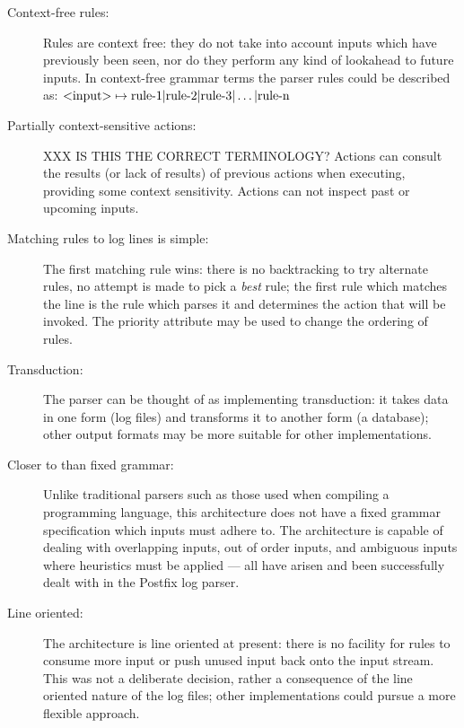 \documentclass[draft]{svmult}
\begin{document}
\begin{description}

    \item [Context-free rules:]  Rules are context free: they do not take
        into account inputs which have previously been seen, nor do they
        perform any kind of lookahead to future inputs.  In context-free
        grammar terms the parser rules could be described as:
        $\text{\textless{}input\textgreater{}} \mapsto \text{rule-1} |
        \text{rule-2} | \text{rule-3} | \dots | \text{rule-n}$

    \item [Partially context-sensitive actions:]  XXX IS THIS THE CORRECT
        TERMINOLOGY\@?  Actions can consult the results (or lack of
        results) of previous actions when executing, providing some context
        sensitivity.  Actions can not inspect past or upcoming inputs.

    \item [Matching rules to log lines is simple:]  The first matching rule
        wins: there is no backtracking to try alternate rules, no attempt
        is made to pick a \textit{best\/} rule; the first rule which
        matches the line is the rule which parses it and determines the
        action that will be invoked.  The priority attribute may be used to
        change the ordering of rules.

    \item [Transduction:]  The parser can be thought of as implementing
        transduction: it takes data in one form (log files) and transforms
        it to another form (a database); other output formats may be more
        suitable for other implementations.

    \item [Closer to \NLP{} than fixed grammar:]  Unlike traditional
        parsers such as those used when compiling a programming language,
        this architecture does not have a fixed grammar specification which
        inputs must adhere to.  The architecture is capable of dealing with
        overlapping inputs, out of order inputs, and ambiguous inputs where
        heuristics must be applied --- all have arisen and been
        successfully dealt with in the Postfix log parser.

    \item [Line oriented:]  The architecture is line oriented at present:
        there is no facility for rules to consume more input or push
        unused input back onto the input stream.  This was not a deliberate
        decision, rather a consequence of the line oriented nature of the
        log files; other implementations could pursue a more flexible
        approach.

\end{description}
\end{document}
